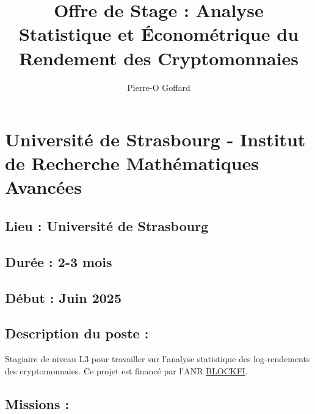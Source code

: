 \documentclass[a4paper,12pt]{article}
\title{Offre de Stage : Analyse Statistique et Économétrique du Rendement des Cryptomonnaies}
\author{Pierre-O Goffard}
\begin{document}
\maketitle

\section*{Université de Strasbourg - Institut de Recherche Mathématiques Avancées}

\subsection*{Lieu : Université de Strasbourg}

\subsection*{Durée : 2-3 mois}
\subsection*{Début : Juin 2025}

\subsection*{Description du poste :}
Stagiaire de niveau L3 pour travailler sur l'analyse statistique des log-rendements des cryptomonnaies. Ce projet est financé par l'ANR \href{https://anr.fr/Projet-ANR-24-CE38-7885}{BLOCKFI}.

\subsection*{Missions :}
\end{document}
